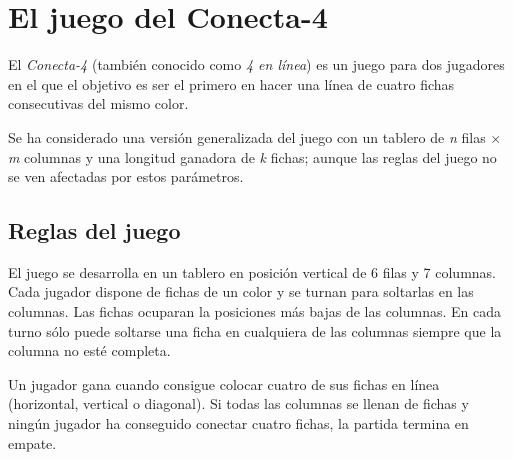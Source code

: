 \section{El juego del Conecta-4}
\label{sec:juego_conecta4}
El \textit{Conecta-4} (también conocido como \textit{4 en línea}) es un juego para dos jugadores en el que el objetivo es ser el primero en hacer una línea de cuatro fichas consecutivas del mismo color.

Se ha considerado una versión generalizada del juego con un tablero de \textit{n} filas $\times$ \textit{m} columnas y una longitud ganadora de \textit{k} fichas; aunque las reglas del juego no se ven afectadas por estos parámetros.

\subsection{Reglas del juego}
\label{ssec:reglas_conecta4}
El juego se desarrolla en un tablero en posición vertical de 6 filas y 7 columnas.
Cada jugador dispone de fichas de un color y se turnan para soltarlas en las columnas.
Las fichas ocuparan la posiciones más bajas de las columnas. 
En cada turno sólo puede soltarse una ficha en cualquiera de las columnas siempre que la columna no esté completa.

Un jugador gana cuando consigue colocar cuatro de sus fichas en línea (horizontal, vertical o diagonal).
Si todas las columnas se llenan de fichas y ningún jugador ha conseguido conectar cuatro fichas, la partida termina en empate.

